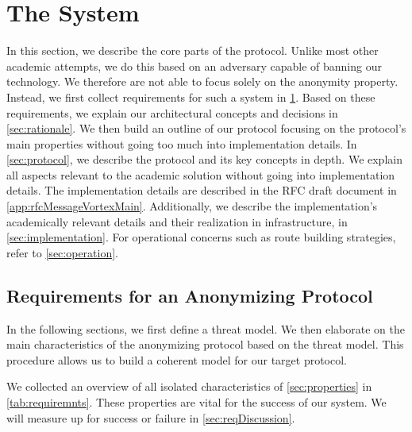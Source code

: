 

\part{The \MessageVortex{} System}\label{sec:coreMVProtocol}
In this section, we describe the core parts of the \MessageVortex{} protocol. Unlike most other academic attempts, we do this based on an adversary capable of banning our technology. We therefore are not able to focus solely on the anonymity property. Instead, we first collect requirements for such a system in \cref{sec:genRequirements}. Based on these requirements, we explain our architectural concepts and decisions in \cref{sec:rationale}. We then build an outline of our protocol focusing on the protocol's main properties without going too much into implementation details. In \cref{sec:protocol}, we describe the protocol and its key concepts in depth. We explain all aspects relevant to the academic solution without going into implementation details. The implementation details are described in the RFC draft document in \cref{app:rfcMessageVortexMain}. Additionally, we describe the implementation's academically relevant details and their realization in infrastructure, in \cref{sec:implementation}. For operational concerns such as route building strategies, refer to \cref{sec:operation}.

\chapter{Requirements for an Anonymizing Protocol}\label{sec:genRequirements}
In the following sections, we first define a threat model. We then elaborate on the main characteristics of the anonymizing protocol based on the threat model. This procedure allows us to build a coherent model for our target protocol.

We collected an overview of all isolated characteristics of \cref{sec:properties} in \cref{tab:requiremnts}. These properties are vital for the success of our system. We will measure up for success or failure in \cref{sec:reqDiscussion}.

